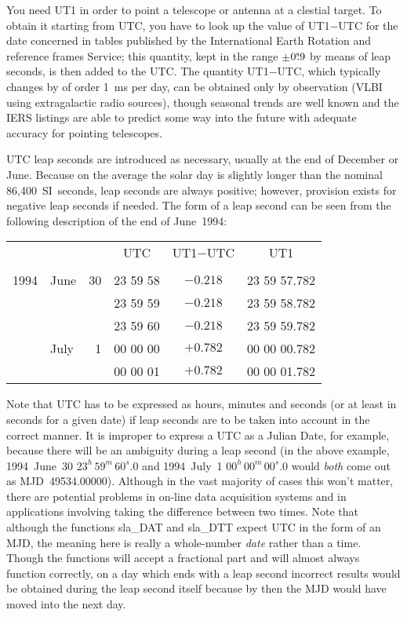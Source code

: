 \documentclass[11pt,twoside]{article}
\newcommand{\tseci}[1]   {$#1$\mbox{$^{\rm s}$}}
\newcommand{\tsec}[2]    {\tseci{#1}$\hspace{-0.3em}.#2$}
\renewcommand{\tsec}[2] {$#1^{\rm s}\hspace{-0.3em}.#2$}
\newcommand{\hms}[4]    {$#1^{\rm h}\,#2^{\rm m}\,$\tsec{#3}{#4}}
\renewcommand{\hms}[4] {$#1^{h}\,#2^{m}\,#3^{s}.#4$}
\begin{document}
You need UT1 in order to point a telescope or antenna at a
clestial target.  To obtain it
starting from UTC, you
have to look up the value of UT1$-$UTC for the date concerned
in tables published by the International Earth Rotation and
reference frames
Service;  this quantity, kept in the range
$\pm$\tsec{0}{9} by means of leap
seconds, is then added to the UTC.  The quantity UT1$-$UTC,
which typically changes by of order 1~ms per day,
can be obtained only by observation (VLBI using
extragalactic radio sources), though seasonal trends
are well known and the IERS listings are able to predict some way into
the future with adequate accuracy for pointing telescopes.

UTC leap seconds are introduced as necessary,
usually at the end of December or June.
Because on the average the solar day is slightly longer
than the nominal 86,400~SI~seconds, leap seconds are always positive;
however, provision exists for negative leap seconds if needed.
The form of a leap second can be seen from the
following description of the end of June~1994:

\hspace{3em}
\begin{tabular}{clrccc} \\
     &      &    &   UTC    & UT1$-$UTC  &    UT1       \\ \\
1994 & June & 30 & 23 59 58 & $-0.218$ & 23 59 57.782 \\
     &      &    & 23 59 59 & $-0.218$ & 23 59 58.782 \\
     &      &    & 23 59 60 & $-0.218$ & 23 59 59.782 \\
     & July &  1 & 00 00 00 & $+0.782$ & 00 00 00.782 \\
     &      &    & 00 00 01 & $+0.782$ & 00 00 01.782 \\
\end{tabular}
\goodbreak

Note that UTC has to be expressed as hours, minutes and
seconds (or at least in seconds for a given date) if leap seconds
are to be taken into account in the
correct manner.
It is improper to express a UTC as a
Julian Date, for example, because there will be an ambiguity
during a leap second (in the above example,
1994~June~30 \hms{23}{59}{60}{0} and
1994~July~1 \hms{00}{00}{00}{0} would {\it both}\/ come out as
MJD~49534.00000).  Although in the vast majority of
cases this won't matter, there are potential problems in
on-line data acquisition systems and in applications involving
taking the difference between two times.  Note that although the functions
sla\_DAT
and
sla\_DTT
expect UTC in the form of an MJD, the meaning here is really a
whole-number {\it date}\/ rather than a time.
Though the functions will accept
a fractional part and will almost always function correctly, on a day
which ends with a leap
second incorrect results would be obtained during the leap second
itself because by then the MJD would have moved into the next day.
\end{document}
